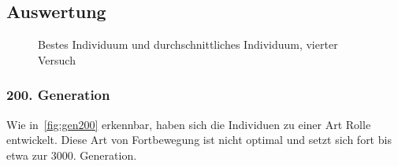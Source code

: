     \subsection{Auswertung}

      \begin{figure}[H]
        \centering
        
        \caption{Bestes Individuum und durchschnittliches Individuum, vierter Versuch\label{fig:graphFourth}}
      \end{figure}

      \subsubsection{200. Generation}

        Wie in~\vref{fig:gen200} erkennbar, haben sich die Individuen zu einer Art Rolle entwickelt.
        Diese Art von Fortbewegung ist nicht optimal und setzt sich fort bis etwa zur 3000. Generation.

        \vspace{0.5cm}

